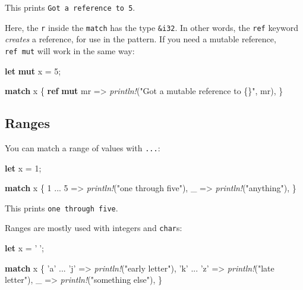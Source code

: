 \documentclass[a4paper,]{book}
\newenvironment{Shaded}{\begin{snugshade}}{\end{snugshade}}
\newcommand{\KeywordTok}[1]{\textcolor[rgb]{0.13,0.29,0.53}{\textbf{{#1}}}}
\newcommand{\DecValTok}[1]{\textcolor[rgb]{0.00,0.00,0.81}{{#1}}}
\newcommand{\CharTok}[1]{\textcolor[rgb]{0.31,0.60,0.02}{{#1}}}
\newcommand{\StringTok}[1]{\textcolor[rgb]{0.31,0.60,0.02}{{#1}}}
\newcommand{\PreprocessorTok}[1]{\textcolor[rgb]{0.56,0.35,0.01}{\textit{{#1}}}}
\newcommand{\NormalTok}[1]{{#1}}
\begin{document}
This prints \texttt{Got\ a\ reference\ to\ 5}.

Here, the \texttt{r} inside the \texttt{match} has the type
\texttt{\&i32}. In other words, the \texttt{ref} keyword \emph{creates}
a reference, for use in the pattern. If you need a mutable reference,
\texttt{ref\ mut} will work in the same way:

\begin{Shaded}
\begin{Highlighting}[]
\KeywordTok{let} \KeywordTok{mut} \NormalTok{x = }\DecValTok{5}\NormalTok{;}

\KeywordTok{match} \NormalTok{x \{}
    \KeywordTok{ref} \KeywordTok{mut} \NormalTok{mr => }\PreprocessorTok{println!}\NormalTok{(}\StringTok{"Got a mutable reference to \{\}"}\NormalTok{, mr),}
\NormalTok{\}}
\end{Highlighting}
\end{Shaded}

\subsection{Ranges}\label{ranges}

You can match a range of values with \texttt{...}:

\begin{Shaded}
\begin{Highlighting}[]
\KeywordTok{let} \NormalTok{x = }\DecValTok{1}\NormalTok{;}

\KeywordTok{match} \NormalTok{x \{}
    \DecValTok{1} \NormalTok{... }\DecValTok{5} \NormalTok{=> }\PreprocessorTok{println!}\NormalTok{(}\StringTok{"one through five"}\NormalTok{),}
    \NormalTok{_ => }\PreprocessorTok{println!}\NormalTok{(}\StringTok{"anything"}\NormalTok{),}
\NormalTok{\}}
\end{Highlighting}
\end{Shaded}

This prints \texttt{one\ through\ five}.

Ranges are mostly used with integers and \texttt{char}s:

\begin{Shaded}
\begin{Highlighting}[]
\KeywordTok{let} \NormalTok{x = }\CharTok{'💅'}\NormalTok{;}

\KeywordTok{match} \NormalTok{x \{}
    \CharTok{'a'} \NormalTok{... }\CharTok{'j'} \NormalTok{=> }\PreprocessorTok{println!}\NormalTok{(}\StringTok{"early letter"}\NormalTok{),}
    \CharTok{'k'} \NormalTok{... }\CharTok{'z'} \NormalTok{=> }\PreprocessorTok{println!}\NormalTok{(}\StringTok{"late letter"}\NormalTok{),}
    \NormalTok{_ => }\PreprocessorTok{println!}\NormalTok{(}\StringTok{"something else"}\NormalTok{),}
\NormalTok{\}}
\end{Highlighting}
\end{Shaded}
\end{document}

